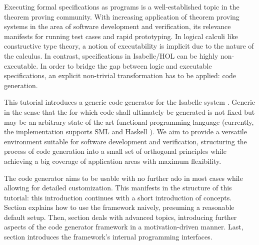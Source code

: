 %
\begin{isabellebody}%
\def\isabellecontext{Codegen}%
%
\isadelimtheory
\isanewline
\isanewline
%
\endisadelimtheory
%
\isatagtheory
%
\endisatagtheory
{\isafoldtheory}%
%
\isadelimtheory
%
\endisadelimtheory
%
\isadelimML
%
\endisadelimML
%
\isatagML
%
\endisatagML
{\isafoldML}%
%
\isadelimML
%
\endisadelimML
%
\isamarkuptrue%
%
\isamarkuptrue%
%
\isamarkuptrue%
%
\begin{isamarkuptext}%
Executing formal specifications as programs is a well-established
  topic in the theorem proving community.  With increasing
  application of theorem proving systems in the area of
  software development and verification, its relevance manifests
  for running test cases and rapid prototyping.  In logical
  calculi like constructive type theory,
  a notion of executability is implicit due to the nature
  of the calculus.  In contrast, specifications in Isabelle/HOL
  can be highly non-executable.  In order to bridge
  the gap between logic and executable specifications,
  an explicit non-trivial transformation has to be applied:
  code generation.

  This tutorial introduces a generic code generator for the
  Isabelle system \cite{isa-tutorial}.
  Generic in the sense that the
   for which code shall ultimately be
  generated is not fixed but may be an arbitrary state-of-the-art
  functional programming language (currently, the implementation
  supports SML \cite{web:sml} and Haskell \cite{web:haskell}).
  We aim to provide a
  versatile environment
  suitable for software development and verification,
  structuring the process
  of code generation into a small set of orthogonal principles
  while achieving a big coverage of application areas
  with maximum flexibility.%
\end{isamarkuptext}%
\isamarkuptrue%
%
\isamarkuptrue%
%
\begin{isamarkuptext}%
The code generator aims to be usable with no further ado
  in most cases while allowing for detailed customization.
  This manifests in the structure of this tutorial: this introduction
  continues with a short introduction of concepts.  Section
   explains how to use the framework naively,
  presuming a reasonable default setup.  Then, section
   deals with advanced topics,
  introducing further aspects of the code generator framework
  in a motivation-driven manner.  Last, section 
  introduces the framework's internal programming interfaces.


\end{isamarkuptext}
\end{isabellebody}
